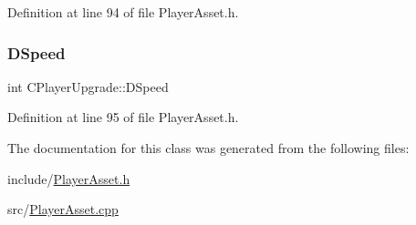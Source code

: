 Definition at line 94 of file Player\+Asset.\+h.

\hypertarget{classCPlayerUpgrade_a3907be12aac44c8606d1d3542446ecdc}{}\label{classCPlayerUpgrade_a3907be12aac44c8606d1d3542446ecdc} 
\subsubsection{\texorpdfstring{D\+Speed}{DSpeed}}
{\footnotesize\ttfamily int C\+Player\+Upgrade\+::\+D\+Speed\hspace{0.3cm}{\ttfamily [protected]}}



Definition at line 95 of file Player\+Asset.\+h.



The documentation for this class was generated from the following files\+:\begin{DoxyCompactItemize}
\item 
include/\hyperlink{PlayerAsset_8h}{Player\+Asset.\+h}\item 
src/\hyperlink{PlayerAsset_8cpp}{Player\+Asset.\+cpp}\end{DoxyCompactItemize}
